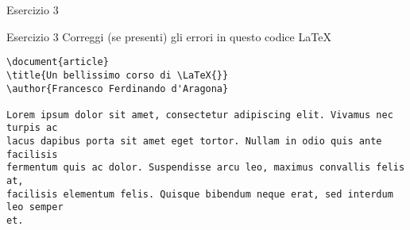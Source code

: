 \begin{frame}[fragile]{Esercizio 3}

\begin{block}{Esercizio 3}
	Correggi (se presenti) gli errori in questo codice \LaTeX{}
	\begin{lstlisting}
\document{article}
\title{Un bellissimo corso di \LaTeX{}}
\author{Francesco Ferdinando d'Aragona}

Lorem ipsum dolor sit amet, consectetur adipiscing elit. Vivamus nec turpis ac
lacus dapibus porta sit amet eget tortor. Nullam in odio quis ante facilisis
fermentum quis ac dolor. Suspendisse arcu leo, maximus convallis felis at,
facilisis elementum felis. Quisque bibendum neque erat, sed interdum leo semper
et.
	\end{lstlisting}
\end{block}

\end{frame}